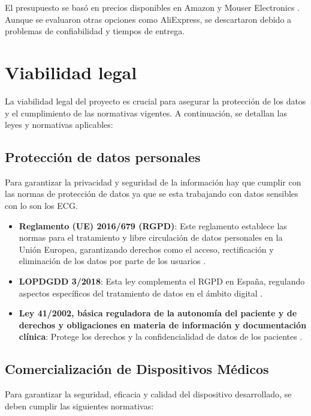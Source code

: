 El presupuesto se basó en precios disponibles en Amazon \cite{amazon} y Mouser Electronics \cite{mouser}. Aunque se evaluaron otras opciones como AliExpress, se descartaron debido a problemas de confiabilidad y tiempos de entrega.



\section{Viabilidad legal}

La viabilidad legal del proyecto es crucial para asegurar la protección de los datos y el cumplimiento de las normativas vigentes. A continuación, se detallan las leyes y normativas aplicables:

\subsection{Protección de datos personales}

Para garantizar la privacidad y seguridad de la información hay que cumplir con las normas de protección de datos ya que se esta trabajando con datos sensibles con lo son los ECG.

\begin{itemize}
    \item \textbf{Reglamento (UE) 2016/679 (RGPD)}:  Este reglamento establece las normas para el tratamiento y libre circulación de datos personales en la Unión Europea, garantizando derechos como el acceso, rectificación y eliminación de los datos por parte de los usuarios \cite{boe_rgpd}.
    \item \textbf{LOPDGDD 3/2018}: Esta ley complementa el RGPD en España, regulando aspectos específicos del tratamiento de datos en el ámbito digital \cite{boe_lopd}.
    \item \textbf{Ley 41/2002, básica reguladora de la autonomía del paciente y de derechos y obligaciones en materia de información y documentación clínica}: Protege los derechos y la confidencialidad de datos de los pacientes \cite{boe_paciente}.
\end{itemize}

\subsection{Comercialización de Dispositivos Médicos}

Para garantizar la seguridad, eficacia y calidad del dispositivo desarrollado, se deben cumplir las siguientes normativas:

